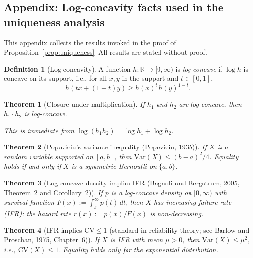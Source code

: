 \documentclass[12pt,a4paper]{article}
\theoremstyle{definition}
\newtheorem{definition}{Definition}[section]
\theoremstyle{plain}
\newtheorem{theorem}{Theorem}[section]
\theoremstyle{remark}
\newcommand{\R}{\mathbb{R}}
\begin{document}
\subsection*{Appendix: Log-concavity facts used in the
  uniqueness analysis}
\label{app:logconcave}


This appendix collects the results invoked in the proof of
Proposition~\ref{prop:uniqueness}.  All results are stated
without proof.

\begin{definition}[Log-concavity]
A function $h : \R \to [0,\infty)$ is \emph{log-concave} if
$\log h$ is concave on its support, i.e., for all $x, y$ in
the support and $t \in [0,1]$,
\[
  h(tx + (1-t)y) \geq h(x)^t\,h(y)^{1-t}.
\]
\end{definition}

\begin{theorem}[Closure under multiplication]
\label{fact:closure_mult}
If $h_1$ and $h_2$ are log-concave, then $h_1 \cdot h_2$ is
log-concave.

This is immediate from
$\log(h_1 h_2) = \log h_1 + \log h_2$.
\end{theorem}

\begin{theorem}[Popoviciu's variance inequality {\normalfont (Popoviciu, 1935)}]
\label{fact:popoviciu}
If $X$ is a random variable supported on $[a,b]$, then
$\mathrm{Var}(X) \leq (b - a)^2/4$.
Equality holds if and only if $X$ is a symmetric Bernoulli
on $\{a, b\}$.
\end{theorem}

\begin{theorem}[Log-concave density implies IFR
  {\normalfont (Bagnoli and Bergstrom, 2005, Theorem~2 and Corollary~2)}]
\label{fact:logconcave_IFR}
If $p$ is a log-concave density on $[0,\infty)$ with survival
function $\bar{F}(x) := \int_x^\infty p(t)\,dt$, then $X$ has
\emph{increasing failure rate} (IFR): the hazard rate
$r(x) := p(x)/\bar{F}(x)$ is non-decreasing.
\end{theorem}

\begin{theorem}[IFR implies $\mathrm{CV} \leq 1$
  {\normalfont (standard in reliability theory; see Barlow and Proschan, 1975, Chapter~6)}]
\label{fact:IFR_CV}
If $X$ is IFR with mean $\mu > 0$, then
$\mathrm{Var}(X) \leq \mu^2$, i.e.,
$\mathrm{CV}(X) \leq 1$.
Equality holds only for the exponential distribution.
\end{theorem}
\end{document}
